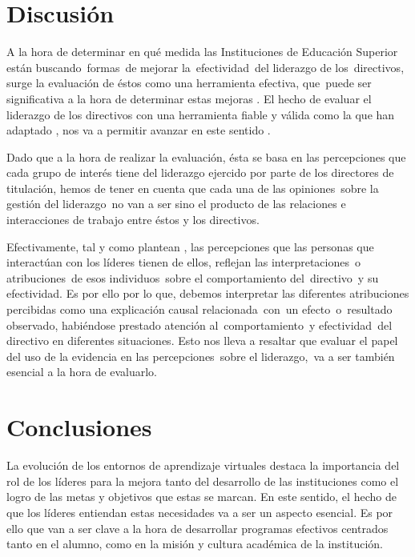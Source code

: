 \documentclass[spanish]{textolivre}
\begin{document}
\section{Discusión}

A la hora de determinar en qué medida las Instituciones de Educación Superior están buscando formas de mejorar la efectividad del liderazgo de los directivos, surge la evaluación de éstos como una herramienta efectiva, que puede ser significativa a la hora de determinar estas mejoras \cite{esguerra_liderazgo_2016}. El hecho de evaluar el liderazgo de los directivos con una herramienta fiable y válida como la que han adaptado \textcite{palomino2023}, nos va a permitir avanzar en este sentido \cite{palomino2022}.

Dado que a la hora de realizar la evaluación, ésta se basa en las percepciones que cada grupo de interés tiene del liderazgo ejercido por parte de los directores de titulación, hemos de tener en cuenta que cada una de las opiniones sobre la gestión del liderazgo no van a ser sino el producto de las relaciones e interacciones de trabajo entre éstos y los directivos. 

Efectivamente, tal y como plantean \textcite{jepsen_perceived_2022}, las percepciones que las personas que interactúan con los líderes tienen de ellos, reflejan las interpretaciones o atribuciones de esos individuos sobre el comportamiento del directivo y su efectividad. Es por ello por lo que, debemos interpretar las diferentes atribuciones percibidas como una explicación causal relacionada con un efecto o resultado observado, habiéndose prestado atención al comportamiento y efectividad del directivo en diferentes situaciones. Esto nos lleva a resaltar que evaluar el papel del uso de la evidencia en las percepciones sobre el liderazgo, va a ser también esencial a la hora de evaluarlo.


\section{Conclusiones}
La evolución de los entornos de aprendizaje virtuales destaca la importancia del rol de los líderes para la mejora tanto del desarrollo de las instituciones como el logro de las metas y objetivos que estas se marcan. En este sentido, el hecho de que los líderes entiendan estas necesidades va a ser un aspecto esencial. Es por ello que van a ser clave a la hora de desarrollar programas efectivos centrados tanto en el alumno, como en la misión y cultura académica de la institución.
\end{document}
